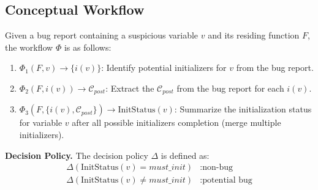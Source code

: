 


\subsection{Conceptual Workflow}
\label{subsec:concept_wf}

Given a bug report containing a suspicious variable \( v \) and its residing function \( F \), the workflow \( \Phi \) is as follows:

\begin{enumerate}
    \item \( \Phi_1(F, v) \rightarrow \{i(v)\} \): Identify potential initializers for \( v \) from the bug report.
    \item \( \Phi_2(F, i(v)) \rightarrow \mathcal{C}_{post} \): Extract the \( \mathcal{C}_{post} \) from the bug report for each \(i(v)\).
    \item \( \Phi_3(F, \{i(v), \mathcal{C}_{post} \}) \rightarrow \text{InitStatus}(v) \): Summarize the initialization status for variable \( v \) after all possible initializers completion (merge multiple initializers). 
\end{enumerate}




\noindent
\textbf{Decision Policy.}
The decision policy \(\Delta\) is defined as: 
\begin{align*}
    \Delta(\text{InitStatus}(v) = \textit{must\_init}) & : \text{non-bug} \\
    \Delta(\text{InitStatus}(v) \neq \textit{must\_init}) & : \text{potential bug}
\end{align*}



